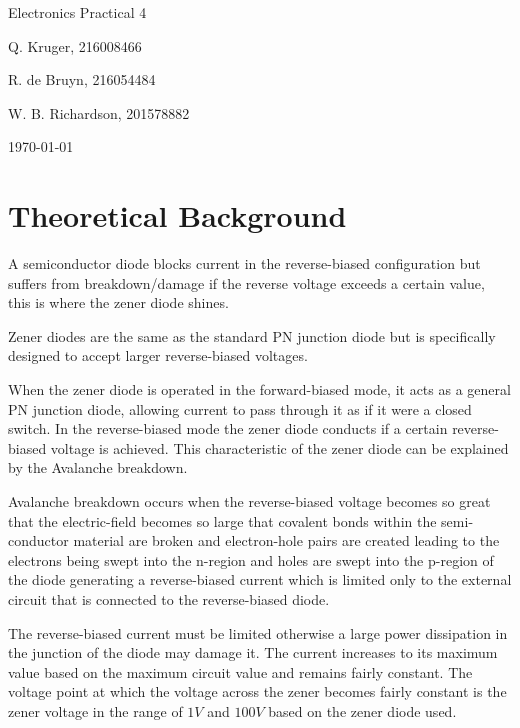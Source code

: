 \documentclass[12pt, a4paper]{article}
\begin{document}
		\begin{titlepage}
			\centering
			{\LARGE Electronics Practical 4 \par}
			\vspace*{1.5cm}
			{\large Q. Kruger, 216008466 \par}
			{\large R. de Bruyn, 216054484 \par}
			{\large W. B. Richardson, 201578882 \par}
			\vspace*{1.2cm}
			{\large \today}
			\vspace*{\fill}
			\vspace*{\fill}
		\end{titlepage}
		\tableofcontents
		\listoffigures
		\newpage

	\section{Theoretical Background} %
	\label{sec:theoretical_backgoround}
		A semiconductor diode blocks current in the reverse-biased configuration but suffers from breakdown/damage if the reverse voltage exceeds a certain value, this is where the zener diode shines.

		Zener diodes are the same as the standard PN junction diode but is specifically designed to accept larger reverse-biased voltages.

		When the zener diode is operated in the forward-biased mode, it acts as a general PN junction diode, allowing current to pass through it as if it were a closed switch. In the reverse-biased mode the zener diode conducts if a certain reverse-biased voltage is achieved. This characteristic of the zener diode can be explained by the Avalanche breakdown.

		Avalanche breakdown occurs when the reverse-biased voltage becomes so great that the electric-field becomes so large that covalent bonds within the semi-conductor material are broken and electron-hole pairs are created leading to the electrons being swept into the n-region and holes are swept into the p-region of the diode generating a reverse-biased current which is limited only to the external circuit that is connected to the reverse-biased diode. 

		The reverse-biased current must be limited otherwise a large power dissipation in the junction of the diode may damage it. The current increases to its maximum value based on the maximum circuit value and remains fairly constant. The voltage point at which the voltage across the zener becomes fairly constant is the zener voltage in the range of $1V$ and $100V$ based on the zener diode used.
\end{document}
